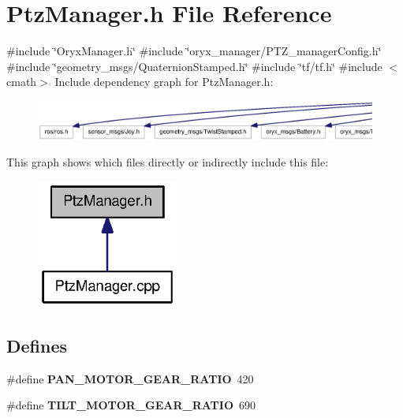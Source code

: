 \section{\-Ptz\-Manager.\-h \-File \-Reference}
\label{PtzManager_8h}
{\ttfamily \#include \char`\"{}\-Oryx\-Manager.\-h\char`\"{}}\*
{\ttfamily \#include \char`\"{}oryx\-\_\-manager/\-P\-T\-Z\-\_\-manager\-Config.\-h\char`\"{}}\*
{\ttfamily \#include \char`\"{}geometry\-\_\-msgs/\-Quaternion\-Stamped.\-h\char`\"{}}\*
{\ttfamily \#include \char`\"{}tf/tf.\-h\char`\"{}}\*
{\ttfamily \#include $<$cmath$>$}\*
\-Include dependency graph for \-Ptz\-Manager.\-h\-:
\nopagebreak
\begin{figure}[H]
\begin{center}
\leavevmode
\includegraphics[width=350pt]{PtzManager_8h__incl}
\end{center}
\end{figure}
\-This graph shows which files directly or indirectly include this file\-:
\nopagebreak
\begin{figure}[H]
\begin{center}
\leavevmode
\includegraphics[width=132pt]{PtzManager_8h__dep__incl}
\end{center}
\end{figure}
\subsection*{\-Defines}
\begin{DoxyCompactItemize}
\item 
\#define {\bf \-P\-A\-N\-\_\-\-M\-O\-T\-O\-R\-\_\-\-G\-E\-A\-R\-\_\-\-R\-A\-T\-I\-O}~420
\item 
\#define {\bf \-T\-I\-L\-T\-\_\-\-M\-O\-T\-O\-R\-\_\-\-G\-E\-A\-R\-\_\-\-R\-A\-T\-I\-O}~690
\end{DoxyCompactItemize}
